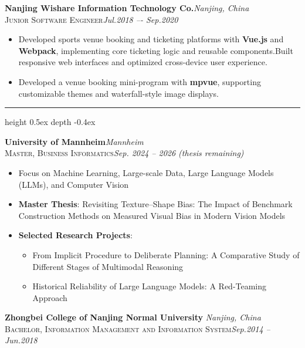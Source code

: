 \documentclass[10pt,a4paper]{article}
\newcommand{\cvsection}[1]{%
  \vspace{8pt}%
  \noindent{\large\bfseries\color{accent}#1\hspace{6pt}}%
  {\color{black!25}\leavevmode\leaders\hrule height 0.5ex depth -0.4ex\hfill\kern0pt}%
  \par\vspace{3pt}%
}
\begin{document}
\vspace{4pt}

\noindent\textbf{Nanjing Wishare Information Technology Co.}\hfill\textit{Nanjing, China}\\
{\scshape\small Junior Software Engineer}\hfill{\small\itshape Jul.2018 –- Sep.2020}
\begin{itemize}[leftmargin=*,topsep=2pt,itemsep=1pt,parsep=0pt]
  \item  Developed sports venue booking and ticketing platforms with \textbf{Vue.js} and \textbf{Webpack}, implementing core ticketing logic and reusable components.Built responsive web interfaces and optimized cross-device user experience.
  \item  Developed a venue booking mini-program with \textbf{mpvue}, supporting customizable themes and waterfall-style image displays.
\end{itemize}

\vspace{6pt}

\cvsection{Education}

\noindent\textbf{University of Mannheim}\hfill\textit{Mannheim}\\
{\scshape\small Master, Business Informatics}\hfill{\small\itshape Sep. 2024 -- 2026 (thesis remaining)}
\begin{itemize}[leftmargin=*,topsep=2pt,itemsep=1pt,parsep=0pt]
  \item Focus on Machine Learning, Large-scale Data, Large Language Models (LLMs), and Computer Vision

  \item \textbf{Master Thesis}: Revisiting Texture--Shape Bias: The Impact of Benchmark Construction Methods on Measured Visual Bias in Modern Vision Models

  \item \textbf{Selected Research Projects}:
  \begin{itemize}[leftmargin=1.2em,itemsep=0pt,topsep=1pt]
      \item From Implicit Procedure to Deliberate Planning: A Comparative Study of Different Stages of Multimodal Reasoning
      \item Historical Reliability of Large Language Models: A Red-Teaming Approach
  \end{itemize}
\end{itemize}

\noindent\textbf{Zhongbei College of Nanjing Normal University }\hfill\textit{Nanjing, China}\\
{\scshape\small Bachelor, Information Management and Information System}\hfill{\small\itshape Sep.2014 – Jun.2018}
\end{document}
